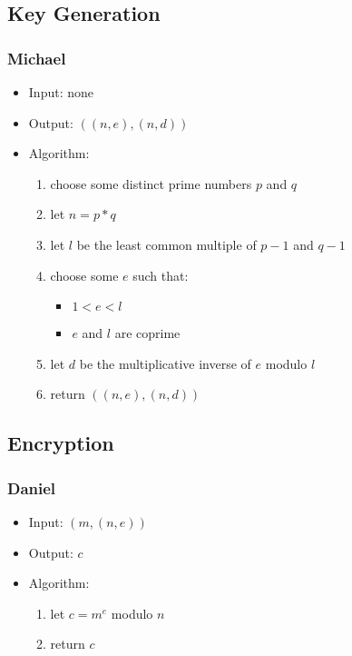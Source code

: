 
\subsection{Key Generation}

\begin{frame}
\frametitle{Michael}
\begin{itemize}
\item Input: none
\item Output: $((n, e), (n, d))$
\item Algorithm:
  \begin{enumerate}
  \item choose some distinct prime numbers $p$ and $q$
  \item let $n = p * q$
  \item let $l$ be the least common multiple of
    $p - 1$ and $q - 1$
  \item choose some $e$ such that:
  \begin{itemize}
    \item $1 < e < l$
    \item $e$ and $l$ are coprime
  \end{itemize}
  \item let $d$ be the multiplicative inverse of $e$
    modulo $l$
  \item return $((n, e), (n, d))$
  \end{enumerate}
\end{itemize}
\end{frame}


\subsection{Encryption}

\begin{frame}
\frametitle{Daniel}
\begin{itemize}
\item Input: $(m, (n, e))$
\item Output: $c$
\item Algorithm:
  \begin{enumerate}
  \item let $c = m^e$ modulo $n$
  \item return $c$
  \end{enumerate}
\end{itemize}
\end{frame}

